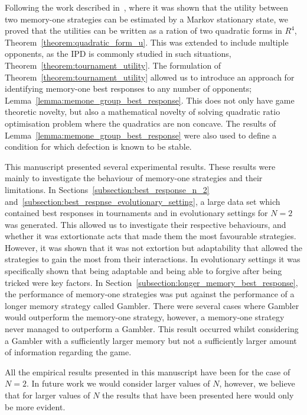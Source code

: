 Following the work described in~\cite{Nowak1989}, where it was shown that the
utility between two memory-one strategies can be estimated by a Markov
stationary state, we proved that the utilities can be written as a ration of two
quadratic forms in $R^4$, Theorem~\ref{theorem:quadratic_form_u}. This was
extended to include multiple opponents, as the IPD is commonly studied in such
situations, Theorem~\ref{theorem:tournament_utility}.
The formulation of Theorem~\ref{theorem:tournament_utility} allowed us to introduce an approach for identifying
memory-one best responses to any number of opponents;
Lemma~\ref{lemma:memone_group_best_response}. This does not only have game
theoretic novelty, but also a mathematical novelty of solving quadratic ratio
optimisation problem where the quadratics are non concave. The results of
Lemma~\ref{lemma:memone_group_best_response} were also used to define a
condition for which defection is known to be stable.

This manuscript presented several experimental results. These results were mainly to
investigate the behaviour of memory-one strategies and their limitations. In
Sections~\ref{subsection:best_response_n_2}
and~\ref{subsection:best_respnse_evolutionary_setting}, a large data set which
contained best responses in tournaments and in evolutionary settings for $N=2$
was generated. This allowed us to investigate their respective behaviours, and
whether it was extortionate acts that made them the most favourable strategies.
However, it was shown that it was not extortion but adaptability that allowed
the strategies to gain the most from their interactions.
In evolutionary settings it was specifically shown that being adaptable and being
able to forgive after being tricked were key factors. In Section~\ref{subsection:longer_memory_best_response}, the performance of
memory-one strategies was put against the performance of a longer memory
strategy called Gambler. There were several cases where Gambler would outperform
the memory-one strategy, however, a memory-one strategy never managed to outperform
a Gambler. This result occurred whilst considering a Gambler with a sufficiently
larger memory but not a sufficiently larger amount of information regarding
the game.

All the empirical results presented in this manuscript have been for the
case of $N=2$. In future work we would consider larger values of $N$, however, we
believe that for larger values of $N$ the results that have been presented here would
only be more evident.

